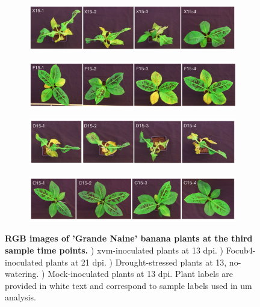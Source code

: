 \begin{figure}[ph!]
    \centering
    \begin{subfigure}[b]{\textwidth}
        \includegraphics[width=\textwidth]{Figures/ThirdTimePointXanthomonasBLQs.pdf}
        \caption{}
        \label{fig:XvmThirdTimeBLQs}
    \end{subfigure}
     \begin{subfigure}[b]{\textwidth}
        \includegraphics[width=\textwidth]{Figures/ThirdTimePointFusariumBLQs.pdf}
        \caption{}
        \label{fig:FocThirdTimeBLQs}
    \end{subfigure}
         \begin{subfigure}[b]{\textwidth}
        \includegraphics[width=\textwidth]{Figures/ThirdTimePointDroughtBLQs.pdf}
        \caption{}
        \label{fig:DroThirdTimeBLQs}
    \end{subfigure}
         \begin{subfigure}[b]{\textwidth}
        \includegraphics[width=\textwidth]{Figures/ThirdTimePointControlBLQs.pdf}
        \caption{}
        \label{fig:ConThirdTimeBLQs}
    \end{subfigure}
    \caption[RGB images of 'Grande Naine' banana plants at the third sample time points.]{\textbf{RGB images of 'Grande Naine' banana plants at the third sample time points.}
    \textbf{}) \acl{xvm}-inoculated plants at 13 \acl{dpi}.
    \textbf{}) \acl{Focub4}-inoculated plants at 21 \acl{dpi}.
    \textbf{}) Drought-stressed plants at 13, no-watering.
    \textbf{}) Mock-inoculated plants at 13 \ac{dpi}.
    Plant labels are provided in white text and correspond to sample labels used in \acl{um} analysis.
    }
    \label{fig:ThridTimePointSymptoms}
\end{figure}

